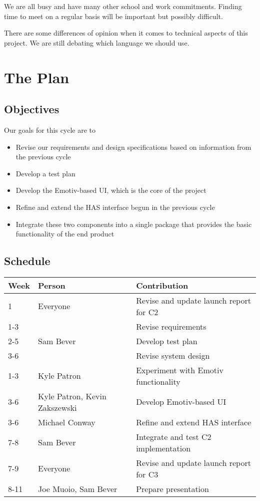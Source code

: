 \documentclass{report}
\begin{document}
We are all busy and have many other school and work commitments. Finding
time to meet on a regular basis will be important but possibly difficult.

There are some differences of opinion when it comes to technical aspects of
this project. We are still debating which language we should use.

\newpage
\section*{\centering The Plan}

\subsection*{Objectives}

Our goals for this cycle are to

\begin{itemize}
    \item Revise our requirements and design specifications based on
        information from the previous cycle
    \item Develop a test plan
    \item Develop the Emotiv-based UI, which is the core of the project
    \item Refine and extend the HAS interface begun in the previous cycle
    \item Integrate these two components into a single package that provides
        the basic functionality of the end product
\end{itemize}

\subsection*{Schedule}

\begin{tabular}{| l | l | l |}
    \hline
    Week & Person & Contribution \\
    \hline \hline

    1 & Everyone & Revise and update launch report for C2 \\ \hline
    1-3 & & Revise requirements \\ \hline
    2-5 & Sam Bever & Develop test plan \\ \hline
    3-6 & & Revise system design \\ \hline
    1-3 & Kyle Patron & Experiment with Emotiv functionality \\ \hline
    3-6 & Kyle Patron, Kevin Zakszewski & Develop Emotiv-based UI \\ \hline
    3-6 & Michael Conway & Refine and extend HAS interface \\ \hline
    7-8 & Sam Bever & Integrate and test C2 implementation \\ \hline
    7-9 & Everyone & Revise and update launch report for C3 \\ \hline
    8-11 & Joe Muoio, Sam Bever & Prepare presentation \\ \hline

\end{tabular}
\end{document}
